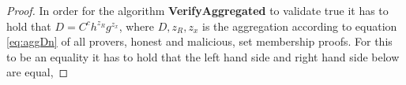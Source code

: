 \begin{proof}
In order for the algorithm \textbf{VerifyAggregated} to validate true it has to hold that $D=C^ch^{z_R}g^{z_x}$, where $D,z_R,z_x$ is the aggregation according to equation \eqref{eq:aggDn} of all provers, honest and malicious,  set membership proofs. For this to be an equality it has to hold that the left hand side and right hand side below are equal, 

\end{proof}
